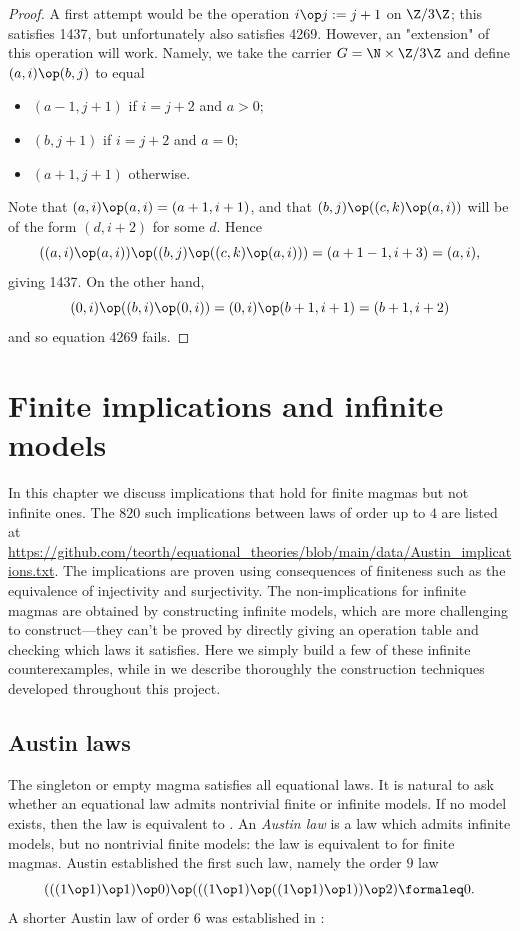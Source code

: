 \begin{proof} A first attempt would be the operation $i \op j := j+1$ on $\Z/3\Z$; this satisfies 1437, but unfortunately also satisfies 4269.  However, an "extension" of this operation will work. Namely, we take the carrier $G = \N \times \Z/3\Z$ and define $(a,i) \op (b,j)$ to equal
  \begin{itemize}
    \item $(a-1,j+1)$ if $i=j+2$ and $a>0$;
    \item $(b,j+1)$ if $i=j+2$ and $a=0$;
    \item $(a+1,j+1)$ otherwise.
  \end{itemize}
Note that $(a,i) \op (a,i) = (a+1,i+1)$, and that $(b,j) \op ((c,k) \op (a,i))$ will be of the form $(d,i+2)$ for some $d$.  Hence
$$ ((a,i) \op (a,i)) \op ((b,j) \op ((c,k) \op (a,i))) = (a+1-1, i+3) = (a,i),$$
giving 1437.  On the other hand,
$$ (0,i) \op ((b,i) \op (0,i)) = (0,i) \op (b+1,i+1) = (b+1,i+2)$$
and so equation 4269 fails.
\end{proof}


\chapter{Finite implications and infinite models}\label{infinite-model-chapter}

In this chapter we discuss implications that hold for finite magmas but not infinite ones.  The $820$ such implications between laws of order up to $4$ are listed at \url{https://github.com/teorth/equational_theories/blob/main/data/Austin_implications.txt}.  The implications are proven using consequences of finiteness such as the equivalence of injectivity and surjectivity.  The non-implications for infinite magmas are obtained by constructing infinite models, which are more challenging to construct---they can't be proved by directly giving an operation table and checking which laws it satisfies.  Here we simply build a few of these infinite counterexamples, while in  we describe thoroughly the construction techniques developed throughout this project.

\section{Austin laws}

The singleton or empty magma satisfies all equational laws.  It is natural to ask whether an equational law admits nontrivial finite or infinite models.
If no model exists, then the law is equivalent to .  An \emph{Austin law} is a law which admits infinite models, but no nontrivial finite models: the law is equivalent to  for finite magmas.
Austin \cite{austin} established the first such law, namely the order $9$ law
$$ (((1 \op 1) \op 1) \op 0) \op (((1 \op 1) \op ((1 \op 1) \op 1)) \op 2) \formaleq 0.$$
A shorter Austin law of order $6$ was established in \cite{Kisielewicz}:

